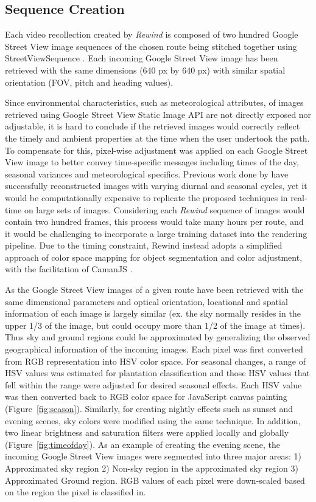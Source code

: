 \documentclass{sigchi}
\begin{document}
\subsection{Sequence Creation} 
Each video recollection created by \textit{Rewind} is composed of two hundred Google Street View image sequences of the chosen route being stitched together using StreetViewSequence \cite{streetviewsequence}. Each incoming Google Street View image has been retrieved with the same dimensions (640 px by 640 px) with similar spatial orientation (FOV, pitch and heading values).

Since environmental characteristics, such as meteorological attributes, of images retrieved using Google Street View Static Image API are not directly exposed nor adjustable, it is hard to conclude if the retrieved images would correctly reflect the timely and ambient properties at the time when the user undertook the path. To compensate for this, pixel-wise adjustment was applied on each Google Street View image to better convey time-specific messages including times of the day, seasonal variances and meteorological specifics. Previous work done by \cite{laffont2014transient,shih2013data} have successfully reconstructed images with varying diurnal and seasonal cycles, yet it would be computationally expensive to replicate the proposed techniques in real-time on large sets of images. Considering each \textit{Rewind} sequence of images would contain two hundred frames, this process would take many hours per route, and it would be challenging to incorporate a large training dataset into the rendering pipeline. Due to the timing constraint, Rewind instead adopts a simplified approach of color space mapping for object segmentation and color adjustment, with the facilitation of CamanJS \cite{caman}.

As the Google Street View images of a given route have been retrieved with the same dimensional parameters and optical orientation, locational and spatial information of each image is largely similar (ex. the sky normally resides in the upper 1/3 of the image, but could occupy more than 1/2 of the image at times). Thus sky and ground regions could be approximated by generalizing the observed geographical information of the incoming images. Each pixel was first converted from RGB representation into HSV color space. For seasonal changes, a range of HSV values was estimated for plantation classification and those HSV values that fell within the range were adjusted for desired seasonal effects. Each HSV value was then converted back to RGB color space for JavaScript canvas painting (Figure~\ref{fig:season}). Similarly, for creating nightly effects such as sunset and evening scenes, sky colors were modified using the same technique. In addition, two linear brightness and saturation filters were applied locally and globally (Figure~\ref{fig:timeofday}). As an example of creating the evening scene, the incoming Google Street View images were segmented into three major areas: 1) Approximated sky region 2) Non-sky region in the approximated sky region 3) Approximated Ground region. RGB values of each pixel were down-scaled based on the region the pixel is classified in. 
\end{document}
